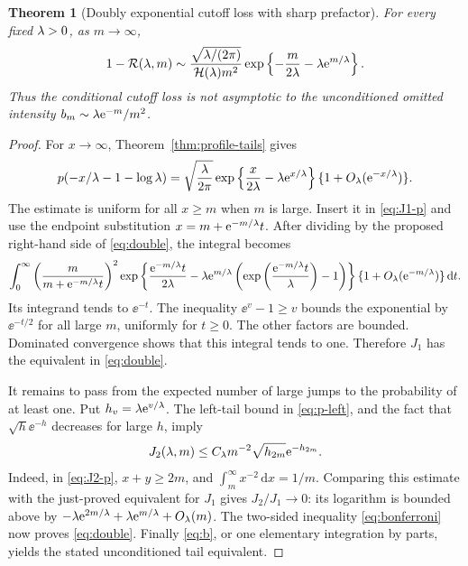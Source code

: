 \documentclass[11pt,a4paper]{article}
\numberwithin{equation}{section}
\newtheorem{theorem}{Theorem}[section]
\theoremstyle{definition}
\theoremstyle{remark}
\newcommand{\dd}{\,\mathrm d}\newcommand{\ii}{\mathrm i}
\newcommand{\HH}{\mathcal H}\newcommand{\RR}{\mathcal R}
\begin{document}
\begin{theorem}[Doubly exponential cutoff loss with sharp prefactor]
\label{thm:double}
For every fixed \(\lambda>0\), as \(m\to\infty\),
\begin{equation}\label{eq:double}
 1-\RR(\la,m)\sim
 \frac{\sqrt{\la/(2\pi)}}{\HH(\la)m^2}
       \exp\left\{-\frac{m}{2\la}-\la\ee^{m/\la}\right\}.
\end{equation}
Thus the conditional cutoff loss is not asymptotic to the unconditioned
omitted intensity \(b_m\sim\lambda\mathrm e^{-m}/m^2\).
\end{theorem}
\begin{proof}
For \(x\to\infty\), Theorem~\ref{thm:profile-tails} gives
\begin{equation}\label{eq:p-for-palm}
 p(-x/\lambda-1-\log\lambda)
 =\sqrt{\frac{\lambda}{2\pi}}\exp\left\{\frac{x}{2\lambda}
                                      -\lambda\mathrm e^{x/\lambda}\right\}
       \{1+O_\lambda(\mathrm e^{-x/\lambda})\}.
\end{equation}
The estimate is uniform for all \(x\ge m\) when \(m\) is large.
Insert it in \eqref{eq:J1-p} and use the endpoint substitution
\(x=m+\mathrm e^{-m/\lambda}t\). After dividing by the proposed right-hand side
of \eqref{eq:double}, the integral becomes
\begin{align*}
 \int_0^\infty
 \left(\frac{m}{m+\ee^{-m/\la}t}\right)^2
 \exp\left\{\frac{\ee^{-m/\la}t}{2\la}
 -\la\ee^{m/\la}
      \left(\exp\left(\frac{\ee^{-m/\la}t}{\la}\right)-1\right)
       \right\}
 \{1+O_\la(\ee^{-m/\la})\}\dd t.
\end{align*}
Its integrand tends to \(\ee^{-t}\). The inequality
\(\ee^v-1\ge v\) bounds the exponential by \(\ee^{-t/2}\) for all
large \(m\), uniformly for \(t\ge0\). The other factors are bounded.
Dominated convergence shows that this integral tends to one. Therefore
\(J_1\) has the equivalent in \eqref{eq:double}.

It remains to pass from the expected number of large jumps to the
probability of at least one. Put \(h_v=\lambda\mathrm e^{v/\lambda}\).
The left-tail bound in \eqref{eq:p-left}, and the fact that
\(\sqrt h\ee^{-h}\) decreases for large \(h\), imply
\[
 J_2(\lambda,m)\le C_\lambda m^{-2}\sqrt{h_{2m}}\mathrm e^{-h_{2m}}.
\]
Indeed, in \eqref{eq:J2-p}, \(x+y\ge2m\), and
\(\int_m^\infty x^{-2}\dd x=1/m\). Comparing this estimate with the
just-proved equivalent for \(J_1\) gives
\(J_2/J_1\to0\): its logarithm is bounded above by
\(-\lambda\mathrm e^{2m/\lambda}+\lambda\mathrm e^{m/\lambda}+O_\lambda(m)\).
The two-sided inequality \eqref{eq:bonferroni} now proves
\eqref{eq:double}. Finally \eqref{eq:b}, or one elementary integration
by parts, yields the stated unconditioned tail equivalent.
\end{proof}
\end{document}

